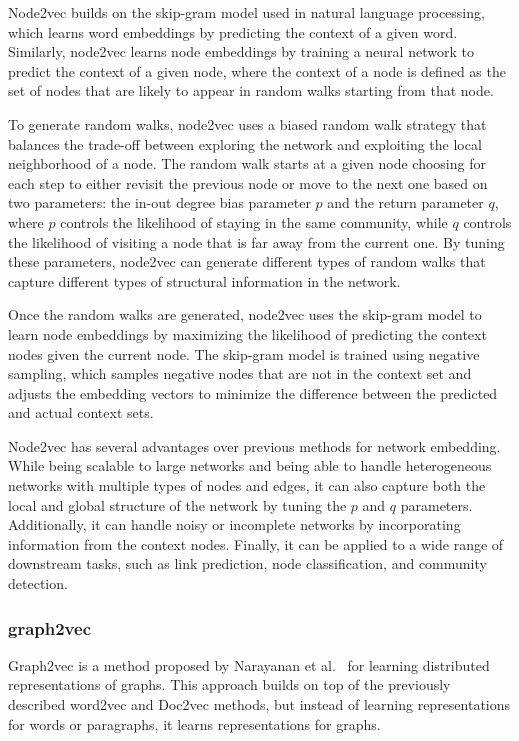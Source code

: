 Node2vec builds on the skip-gram model used in natural language processing, which learns word embeddings by predicting the context of a given word. Similarly, node2vec learns node embeddings by training a neural network to predict the context of a given node, where the context of a node is defined as the set of nodes that are likely to appear in random walks starting from that node.

To generate random walks, node2vec uses a biased random walk strategy that balances the trade-off between exploring the network and exploiting the local neighborhood of a node. The random walk starts at a given node choosing for each step to either revisit the previous node or move to the next one based on two parameters: the in-out degree bias parameter $p$ and the return parameter $q$, where $p$ controls the likelihood of staying in the same community, while $q$ controls the likelihood of visiting a node that is far away from the current one. By tuning these parameters, node2vec can generate different types of random walks that capture different types of structural information in the network.

Once the random walks are generated, node2vec uses the skip-gram model to learn node embeddings by maximizing the likelihood of predicting the context nodes given the current node. The skip-gram model is trained using negative sampling, which samples negative nodes that are not in the context set and adjusts the embedding vectors to minimize the difference between the predicted and actual context sets.

Node2vec has several advantages over previous methods for network embedding. While being scalable to large networks and being able to handle heterogeneous networks with multiple types of nodes and edges, it can also capture both the local and global structure of the network by tuning the $p$ and $q$ parameters. Additionally, it can handle noisy or incomplete networks by incorporating information from the context nodes. Finally, it can be applied to a wide range of downstream tasks, such as link prediction, node classification, and community detection.

\subsubsection{graph2vec}
Graph2vec is a method proposed by Narayanan et al.~\cite{2017graph2vec} for learning distributed representations of graphs. This approach builds on top of the previously described word2vec and Doc2vec methods, but instead of learning representations for words or paragraphs, it learns representations for graphs.

